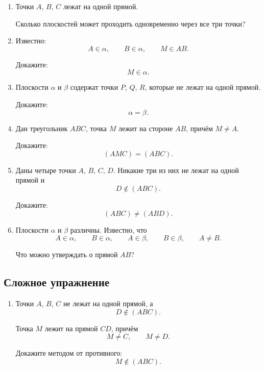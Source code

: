 \documentclass[a4paper,12pt]{article}
\newcommand{\plane}[1]{(#1)}
\begin{document}
\begin{enumerate}[resume]
  \item
  Точки $A$, $B$, $C$ лежат на одной прямой.

  Сколько плоскостей может проходить одновременно через все три точки?

  \item
  Известно:
  \[
  A\in\alpha,\qquad
  B\in\alpha,\qquad
  M\in AB.
  \]

  Докажите:
  \[
  M\in\alpha.
  \]

  \item
  Плоскости $\alpha$ и $\beta$ содержат точки $P$, $Q$, $R$, которые не лежат на одной прямой.

  Докажите:
  \[
  \alpha=\beta.
  \]

  \item
  Дан треугольник $ABC$, точка $M$ лежит на стороне $AB$, причём $M\ne A$.

  Докажите:
  \[
  \plane{AMC}=\plane{ABC}.
  \]

  \item
  Даны четыре точки $A$, $B$, $C$, $D$. Никакие три из них не лежат на одной прямой и
  \[
  D\notin\plane{ABC}.
  \]

  Докажите:
  \[
  \plane{ABC}\ne\plane{ABD}.
  \]

  \item
  Плоскости $\alpha$ и $\beta$ различны. Известно, что
  \[
  A\in\alpha,\qquad
  B\in\alpha,\qquad
  A\in\beta,\qquad
  B\in\beta,
  \qquad A\ne B.
  \]

  Что можно утверждать о прямой $AB$?
\end{enumerate}

\subsection*{\textcolor{accent}{Сложное упражнение}}

\begin{enumerate}[resume]
  \item
  Точки $A$, $B$, $C$ не лежат на одной прямой, а
  \[
  D\notin\plane{ABC}.
  \]

  Точка $M$ лежит на прямой $CD$, причём
  \[
  M\ne C,\qquad M\ne D.
  \]

  Докажите методом от противного:
  \[
  M\notin\plane{ABC}.
  \]
\end{enumerate}
\end{document}
